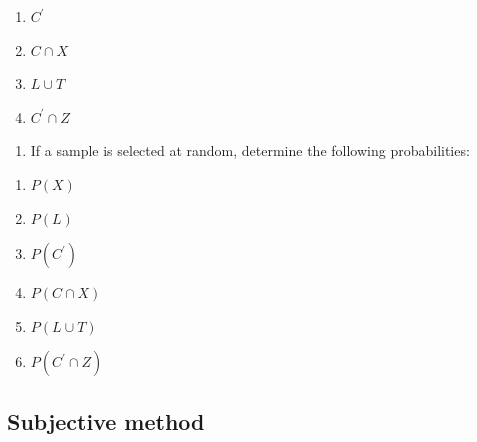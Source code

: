 \documentclass[]{book}
\providecommand{\tightlist}{%
  \setlength{\itemsep}{0pt}\setlength{\parskip}{0pt}}
\begin{document}
\begin{enumerate}
\def\labelenumi{(\alph{enumi})}
\tightlist
\item
  \(C^\prime\)
\item
  \(C \cap X\)
\item
  \(L \cup T\)
\item
  \(C^\prime \cap Z\)
\end{enumerate}

\begin{enumerate}
\def\labelenumi{\Roman{enumi}.}
\setcounter{enumi}{1}
\tightlist
\item
  If a sample is selected at random, determine the following probabilities:
\end{enumerate}

\begin{enumerate}
\def\labelenumi{(\alph{enumi})}
\tightlist
\item
  \(P(X)\)
\item
  \(P(L)\)
\item
  \(P(C^\prime)\)
\item
  \(P(C \cap X)\)
\item
  \(P( L \cup T)\)
\item
  \(P(C^\prime \cap Z)\)
\end{enumerate}

\hypertarget{subjective-method}{%
\subsection{Subjective method}\label{subjective-method}}
\end{document}
